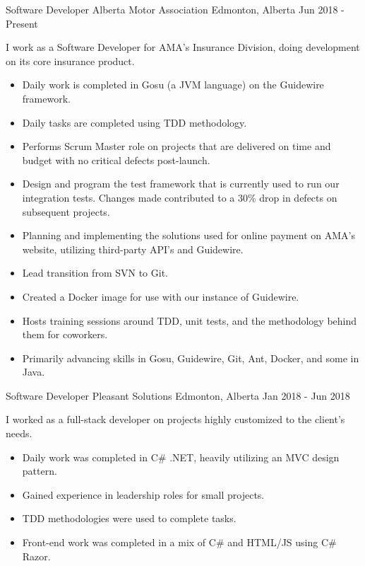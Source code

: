 
\begin{cventries}
    \cventry
        {Software Developer}
        {Alberta Motor Association}
        {Edmonton, Alberta}
        {Jun 2018 - Present}
        {
            I work as a Software Developer for AMA’s Insurance Division, doing development on its core insurance product.
            \begin{itemize}
                \item Daily work is completed in Gosu (a JVM language) on the Guidewire framework.
                \item Daily tasks are completed using TDD methodology.
                \item Performs Scrum Master role on projects that are delivered on time and budget with no critical defects post-launch.
                \item Design and program the test framework that is currently used to run our integration tests. Changes made contributed to a 30\% drop in defects on subsequent projects.
                \item Planning and implementing the solutions used for online payment on AMA’s website, utilizing third-party API’s and Guidewire.
                \item Lead transition from SVN to Git.
                \item Created a Docker image for use with our instance of Guidewire.
                \item Hosts training sessions around TDD, unit tests, and the methodology behind them for coworkers.
                \item Primarily advancing skills in Gosu, Guidewire, Git, Ant, Docker, and some in Java.
            \end{itemize}
        }
    \cventry
        {Software Developer}
        {Pleasant Solutions}
        {Edmonton, Alberta}
        {Jan 2018 - Jun 2018}
        {
            I worked as a full-stack developer on projects highly customized to the client’s needs.
            \begin{itemize}
                \item Daily work was completed in C\# .NET, heavily utilizing an MVC design pattern.
                \item Gained experience in leadership roles for small projects.
                \item TDD methodologies were used to complete tasks.
                \item Front-end work was completed in a mix of C\# and HTML/JS using C\# Razor.

\end{itemize}}
\end{cventries}
